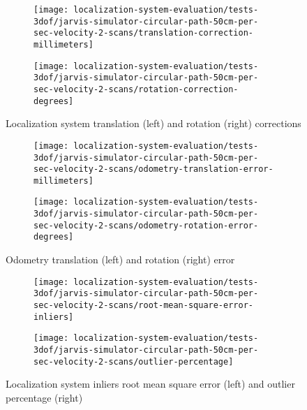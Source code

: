 \begin{figure}[ht]
	\centering
	\begin{subfigure}[h]{0.47\textwidth}
		\centering
		\texttt{[image: localization-system-evaluation/tests-3dof/jarvis-simulator-circular-path-50cm-per-sec-velocity-2-scans/translation-correction-millimeters]}
	\end{subfigure}
	\begin{subfigure}[h]{0.47\textwidth}
		\centering
		\texttt{[image: localization-system-evaluation/tests-3dof/jarvis-simulator-circular-path-50cm-per-sec-velocity-2-scans/rotation-correction-degrees]}
	\end{subfigure}
	\caption{Localization system translation (left) and rotation (right) corrections}
	\label{fig:localization-system-evaluation_jarvis-simulator-circular-path-50cm-per-sec-velocity-2-scans_translation-rotation-corrections}
\end{figure}

\begin{figure}[ht]
	\centering
	\begin{subfigure}[h]{0.47\textwidth}
		\centering
		\texttt{[image: localization-system-evaluation/tests-3dof/jarvis-simulator-circular-path-50cm-per-sec-velocity-2-scans/odometry-translation-error-millimeters]}
	\end{subfigure}
	\begin{subfigure}[h]{0.47\textwidth}
		\centering
		\texttt{[image: localization-system-evaluation/tests-3dof/jarvis-simulator-circular-path-50cm-per-sec-velocity-2-scans/odometry-rotation-error-degrees]}
	\end{subfigure}
	\caption{Odometry translation (left) and rotation (right) error}
	\label{fig:localization-system-evaluation_jarvis-simulator-circular-path-50cm-per-sec-velocity-2-scans_odometry-translation-rotation-errors}
\end{figure}

\begin{figure}[ht]
	\centering
	\begin{subfigure}[h]{0.47\textwidth}
		\centering
		\texttt{[image: localization-system-evaluation/tests-3dof/jarvis-simulator-circular-path-50cm-per-sec-velocity-2-scans/root-mean-square-error-inliers]}
	\end{subfigure}
	\begin{subfigure}[h]{0.47\textwidth}
		\centering
		\texttt{[image: localization-system-evaluation/tests-3dof/jarvis-simulator-circular-path-50cm-per-sec-velocity-2-scans/outlier-percentage]}
	\end{subfigure}
	\caption{Localization system inliers root mean square error (left) and outlier percentage (right)}
	\label{fig:localization-system-evaluation_jarvis-simulator-circular-path-50cm-per-sec-velocity-2-scans_inliers-rmse-outliers-percentage}
\end{figure}

